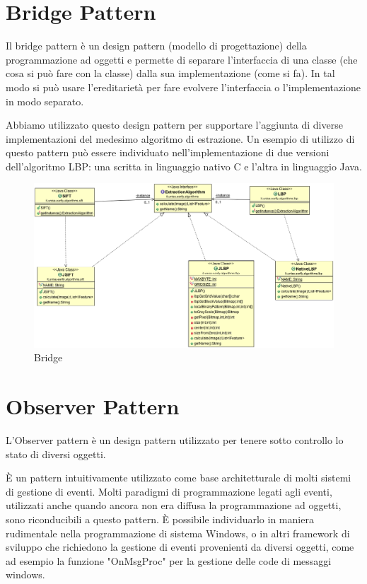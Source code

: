 \section{Bridge Pattern}
Il bridge pattern è un design pattern (modello di progettazione) della programmazione ad oggetti e permette di separare l'interfaccia di una classe (che cosa si può fare con la classe) dalla sua implementazione (come si fa). In tal modo si può usare l'ereditarietà per fare evolvere l'interfaccia o l'implementazione in modo separato.

Abbiamo utilizzato questo design pattern per supportare l'aggiunta di diverse implementazioni del medesimo algoritmo di estrazione. Un esempio di utilizzo di questo pattern può essere individuato nell'implementazione di due versioni dell'algoritmo LBP: una scritta in linguaggio nativo C e l'altra in linguaggio Java.

\begin{figure}[ht]
	\centering
	\includegraphics[width=1.5\textwidth, angle=90]{img/bridge.png}
	\caption{Bridge}\label{fig:bridge}
\end{figure}

\section{Observer Pattern}
L'Observer pattern è un design pattern utilizzato per tenere sotto controllo lo stato di diversi oggetti.

È un pattern intuitivamente utilizzato come base architetturale di molti sistemi di gestione di eventi. Molti paradigmi di programmazione legati agli eventi, utilizzati anche quando ancora non era diffusa la programmazione ad oggetti, sono riconducibili a questo pattern. È possibile individuarlo in maniera rudimentale nella programmazione di sistema Windows, o in altri framework di sviluppo che richiedono la gestione di eventi provenienti da diversi oggetti, come ad esempio la funzione "OnMsgProc" per la gestione delle code di messaggi windows.

